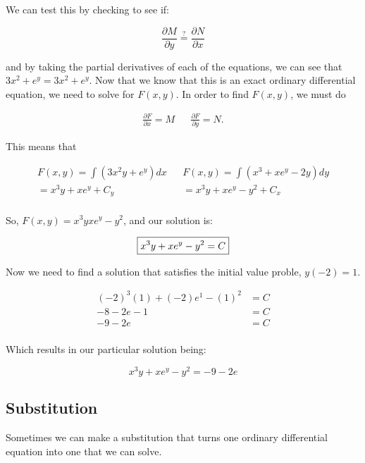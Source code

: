 \begin{problem}
    We can test this by checking to see if:
    
    \begin{equation}
      \frac{\partial M}{\partial y}\stackrel{?}{=}\frac{\partial N}{\partial x}
    \end{equation}

    and by taking the partial derivatives of each of the equations, we can see that $3x^2+e^y=3x^2+e^y$. Now that we know that this is an exact ordinary differential equation, we need to solve for $F(x,y)$. In order to find $F(x,y)$, we must do 

    \begin{align}
      \frac{\partial F}{\partial x}=M && \frac{\partial F}{\partial y}=N.
      \end{align}

      This means that 

      \begin{align}
        F(x,y)=\int(3x^2y+e^y)dx && F(x,y)=\int(x^3+xe^y-2y)dy\\
        =x^3y+xe^y+C_y && =x^3y+xe^y-y^2+C_x\\
      \end{align}

      So, $F(x,y)=x^3yxe^y-y^2$, and our solution is:

      \begin{equation}
        \boxed{x^3y+xe^y-y^2=C}\\
      \end{equation}

      Now we need to find a solution that satisfies the initial value proble, $y(-2)=1$.
      
      \begin{align}
        (-2)^3(1)+(-2)e^1-(1)^2&=C\\
        -8-2e-1&=C\\
        -9-2e&=C\\
      \end{align}

      Which results in our particular solution being:

      \begin{equation}
        \boxed{x^3y+xe^y-y^2=-9-2e}
      \end{equation}
    \end{problem}

  \subsection{Substitution}
    Sometimes we can make a substitution that turns one ordinary differential equation into one that we can solve.
    
